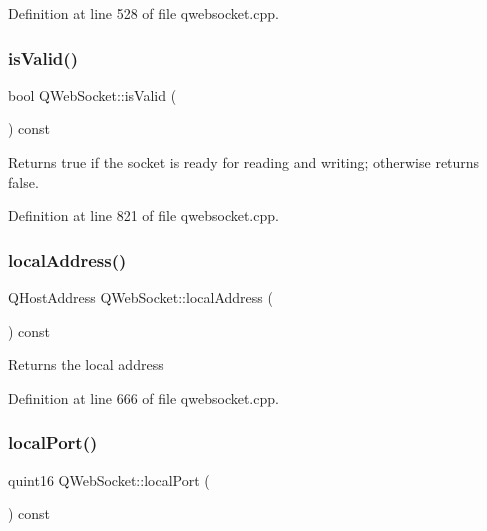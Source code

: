 Definition at line 528 of file qwebsocket.\+cpp.

\mbox{\label{class_q_web_socket_ad5d5224aa46a4e4429d17b0c4f6854c2}} 
\subsubsection{\texorpdfstring{is\+Valid()}{isValid()}}
{\footnotesize\ttfamily bool Q\+Web\+Socket\+::is\+Valid (\begin{DoxyParamCaption}{ }\end{DoxyParamCaption}) const}

Returns {\ttfamily true} if the socket is ready for reading and writing; otherwise returns {\ttfamily false}. 

Definition at line 821 of file qwebsocket.\+cpp.

\mbox{\label{class_q_web_socket_aba293f65947a7690afe4e142cc77aa54}} 
\subsubsection{\texorpdfstring{local\+Address()}{localAddress()}}
{\footnotesize\ttfamily Q\+Host\+Address Q\+Web\+Socket\+::local\+Address (\begin{DoxyParamCaption}{ }\end{DoxyParamCaption}) const}

Returns the local address 

Definition at line 666 of file qwebsocket.\+cpp.

\mbox{\label{class_q_web_socket_af5c606f929fe8860b5f3e2f581fd4e02}} 
\subsubsection{\texorpdfstring{local\+Port()}{localPort()}}
{\footnotesize\ttfamily quint16 Q\+Web\+Socket\+::local\+Port (\begin{DoxyParamCaption}{ }\end{DoxyParamCaption}) const}


